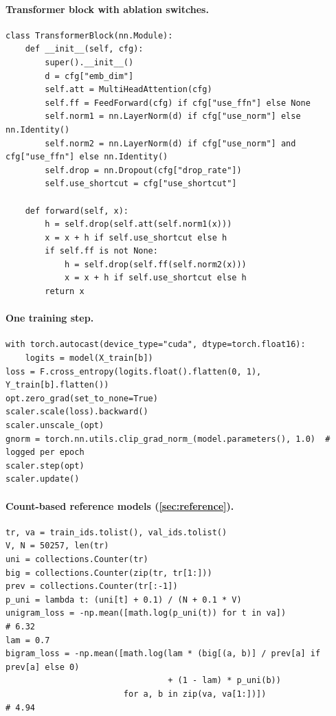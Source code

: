 \documentclass[11pt,a4paper]{article}
\begin{document}
\paragraph{Transformer block with ablation switches.}
\begin{lstlisting}
class TransformerBlock(nn.Module):
    def __init__(self, cfg):
        super().__init__()
        d = cfg["emb_dim"]
        self.att = MultiHeadAttention(cfg)
        self.ff = FeedForward(cfg) if cfg["use_ffn"] else None
        self.norm1 = nn.LayerNorm(d) if cfg["use_norm"] else nn.Identity()
        self.norm2 = nn.LayerNorm(d) if cfg["use_norm"] and cfg["use_ffn"] else nn.Identity()
        self.drop = nn.Dropout(cfg["drop_rate"])
        self.use_shortcut = cfg["use_shortcut"]

    def forward(self, x):
        h = self.drop(self.att(self.norm1(x)))
        x = x + h if self.use_shortcut else h
        if self.ff is not None:
            h = self.drop(self.ff(self.norm2(x)))
            x = x + h if self.use_shortcut else h
        return x
\end{lstlisting}

\paragraph{One training step.}
\begin{lstlisting}
with torch.autocast(device_type="cuda", dtype=torch.float16):
    logits = model(X_train[b])
loss = F.cross_entropy(logits.float().flatten(0, 1), Y_train[b].flatten())
opt.zero_grad(set_to_none=True)
scaler.scale(loss).backward()
scaler.unscale_(opt)
gnorm = torch.nn.utils.clip_grad_norm_(model.parameters(), 1.0)  # logged per epoch
scaler.step(opt)
scaler.update()
\end{lstlisting}

\paragraph{Count-based reference models (\cref{sec:reference}).}
\begin{lstlisting}
tr, va = train_ids.tolist(), val_ids.tolist()
V, N = 50257, len(tr)
uni = collections.Counter(tr)
big = collections.Counter(zip(tr, tr[1:]))
prev = collections.Counter(tr[:-1])
p_uni = lambda t: (uni[t] + 0.1) / (N + 0.1 * V)
unigram_loss = -np.mean([math.log(p_uni(t)) for t in va])                 # 6.32
lam = 0.7
bigram_loss = -np.mean([math.log(lam * (big[(a, b)] / prev[a] if prev[a] else 0)
                                 + (1 - lam) * p_uni(b))
                        for a, b in zip(va, va[1:])])                     # 4.94
\end{lstlisting}
\end{document}
